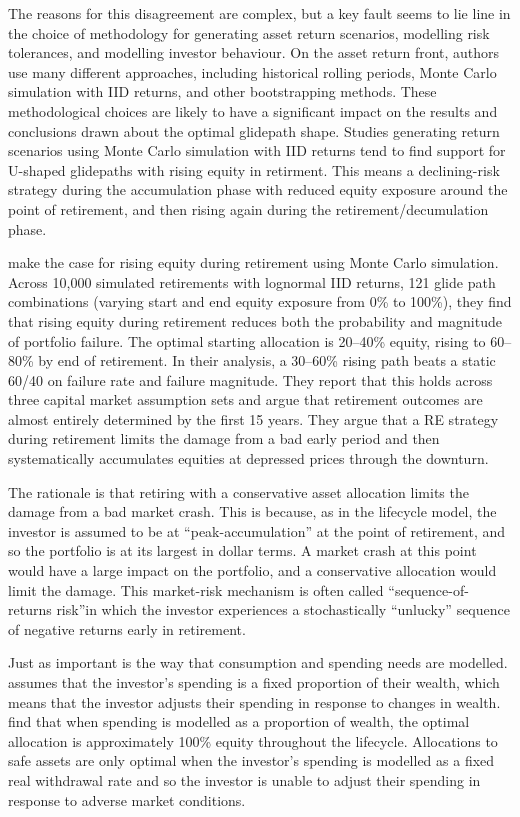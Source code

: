 \documentclass[11pt]{article}
\begin{document}
The reasons for this disagreement are complex, but a key fault seems to lie line in the choice of methodology for generating asset return scenarios, modelling risk tolerances, and modelling investor behaviour. On the asset return front, authors use many different approaches, including historical rolling periods, Monte Carlo simulation with IID returns, and other bootstrapping methods. These methodological choices are likely to have a significant impact on the results and conclusions drawn about the optimal glidepath shape. Studies generating return scenarios using Monte Carlo simulation with IID returns tend to find support for U-shaped glidepaths with rising equity in retirment. This means a declining-risk strategy during the accumulation phase with reduced equity exposure around the point of retirement, and then rising again during the retirement/decumulation phase. 

\textcite{pfau2014rising} make the case for rising equity during retirement using Monte Carlo simulation. Across 10,000 simulated retirements with lognormal IID returns, 121 glide path combinations (varying start and end equity exposure from 0\% to 100\%), they find that rising equity during retirement reduces both the probability and magnitude of portfolio failure. The optimal starting allocation is 20--40\% equity, rising to 60--80\% by end of retirement. In their analysis, a 30--60\% rising path beats a static 60/40 on failure rate and failure magnitude. They report that this holds across three capital market assumption sets and argue that retirement outcomes are almost entirely determined by the first 15 years. They argue that a RE strategy during retirement limits the damage from a bad early period and then systematically accumulates equities at depressed prices through the downturn. 

The rationale is that retiring with a conservative asset allocation limits the damage from a bad market crash. This is because, as in the lifecycle model, the investor is assumed to be at ``peak-accumulation'' at the point of retirement, and so the portfolio is at its largest in dollar terms. A market crash at this point would have a large impact on the portfolio, and a conservative allocation would limit the damage. This market-risk mechanism is often called ``sequence-of-returns risk''in which the investor experiences a stochastically ``unlucky'' sequence of negative returns early in retirement. 

Just as important is the way that consumption and spending needs are modelled. \textcite{merton1969lifetime} assumes that the investor's spending is a fixed proportion of their wealth, which means that the investor adjusts their spending in response to changes in wealth. \textcite{anarkulova2025beyond} find that when spending is modelled as a proportion of wealth, the optimal allocation is approximately 100\% equity throughout the lifecycle. Allocations to safe assets are only optimal when the investor's spending is modelled as a fixed real withdrawal rate and so the investor is unable to adjust their spending in response to adverse market conditions. 
\end{document}
